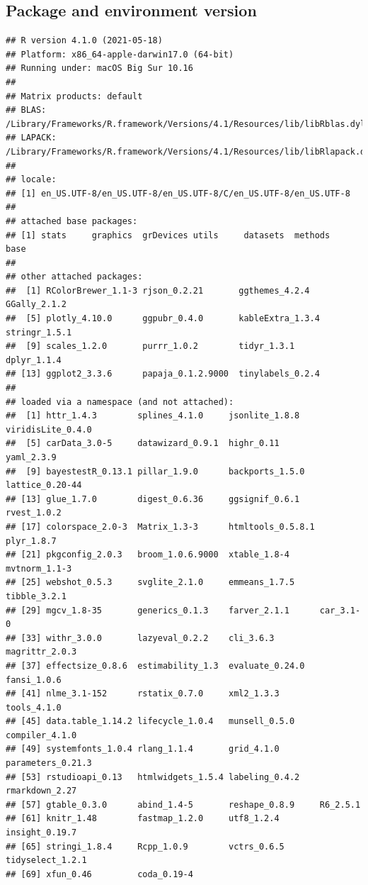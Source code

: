 \documentclass[
]{article}
\begin{document}
\hypertarget{package-and-environment-version}{%
\subsection{Package and environment
version}\label{package-and-environment-version}}

\begin{verbatim}
## R version 4.1.0 (2021-05-18)
## Platform: x86_64-apple-darwin17.0 (64-bit)
## Running under: macOS Big Sur 10.16
## 
## Matrix products: default
## BLAS:   /Library/Frameworks/R.framework/Versions/4.1/Resources/lib/libRblas.dylib
## LAPACK: /Library/Frameworks/R.framework/Versions/4.1/Resources/lib/libRlapack.dylib
## 
## locale:
## [1] en_US.UTF-8/en_US.UTF-8/en_US.UTF-8/C/en_US.UTF-8/en_US.UTF-8
## 
## attached base packages:
## [1] stats     graphics  grDevices utils     datasets  methods   base     
## 
## other attached packages:
##  [1] RColorBrewer_1.1-3 rjson_0.2.21       ggthemes_4.2.4     GGally_2.1.2      
##  [5] plotly_4.10.0      ggpubr_0.4.0       kableExtra_1.3.4   stringr_1.5.1     
##  [9] scales_1.2.0       purrr_1.0.2        tidyr_1.3.1        dplyr_1.1.4       
## [13] ggplot2_3.3.6      papaja_0.1.2.9000  tinylabels_0.2.4  
## 
## loaded via a namespace (and not attached):
##  [1] httr_1.4.3        splines_4.1.0     jsonlite_1.8.8    viridisLite_0.4.0
##  [5] carData_3.0-5     datawizard_0.9.1  highr_0.11        yaml_2.3.9       
##  [9] bayestestR_0.13.1 pillar_1.9.0      backports_1.5.0   lattice_0.20-44  
## [13] glue_1.7.0        digest_0.6.36     ggsignif_0.6.1    rvest_1.0.2      
## [17] colorspace_2.0-3  Matrix_1.3-3      htmltools_0.5.8.1 plyr_1.8.7       
## [21] pkgconfig_2.0.3   broom_1.0.6.9000  xtable_1.8-4      mvtnorm_1.1-3    
## [25] webshot_0.5.3     svglite_2.1.0     emmeans_1.7.5     tibble_3.2.1     
## [29] mgcv_1.8-35       generics_0.1.3    farver_2.1.1      car_3.1-0        
## [33] withr_3.0.0       lazyeval_0.2.2    cli_3.6.3         magrittr_2.0.3   
## [37] effectsize_0.8.6  estimability_1.3  evaluate_0.24.0   fansi_1.0.6      
## [41] nlme_3.1-152      rstatix_0.7.0     xml2_1.3.3        tools_4.1.0      
## [45] data.table_1.14.2 lifecycle_1.0.4   munsell_0.5.0     compiler_4.1.0   
## [49] systemfonts_1.0.4 rlang_1.1.4       grid_4.1.0        parameters_0.21.3
## [53] rstudioapi_0.13   htmlwidgets_1.5.4 labeling_0.4.2    rmarkdown_2.27   
## [57] gtable_0.3.0      abind_1.4-5       reshape_0.8.9     R6_2.5.1         
## [61] knitr_1.48        fastmap_1.2.0     utf8_1.2.4        insight_0.19.7   
## [65] stringi_1.8.4     Rcpp_1.0.9        vctrs_0.6.5       tidyselect_1.2.1 
## [69] xfun_0.46         coda_0.19-4
\end{verbatim}
\end{document}
